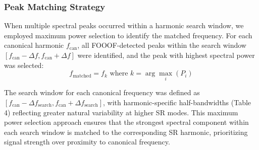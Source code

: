 \documentclass[11pt,a4paper]{article}
\begin{document}
\subsubsection{Peak Matching Strategy}
When multiple spectral peaks occurred within a harmonic search window, we employed maximum power selection to identify the matched frequency. For each canonical harmonic $f_{\text{can}}$, all FOOOF-detected peaks within the search window $[f_{\text{can}} - \Delta f, f_{\text{can}} + \Delta f]$ were identified, and the peak with highest spectral power was selected:
\begin{displaymath}
f_{\text{matched}} = f_k \text{ where } k = \arg\max_i(P_i)
\end{displaymath}
\begin{table}[h]
    \centering
\end{table}

The search window for each canonical frequency was defined as $[f_{\text{can}} - \Delta f_{\text{search}}, f_{\text{can}} + \Delta f_{\text{search}}]$, with harmonic-specific half-bandwidths (Table 4) reflecting greater natural variability at higher SR modes. This maximum power selection approach ensures that the strongest spectral component within each search window is matched to the corresponding SR harmonic, prioritizing signal strength over proximity to canonical frequency.
\end{document}
